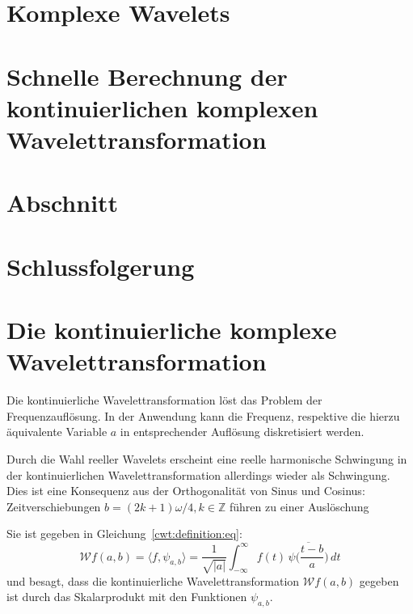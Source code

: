 \begin{refsection}

\section{Komplexe Wavelets}

\section{Schnelle Berechnung der kontinuierlichen komplexen Wavelettransformation}

\section{Abschnitt}

\section{Schlussfolgerung}

\section{Die kontinuierliche komplexe Wavelettransformation}
Die kontinuierliche Wavelettransformation löst das Problem der Frequenzauflösung.
In der Anwendung kann die Frequenz, respektive die hierzu äquivalente Variable $a$ in entsprechender Auflösung diskretisiert werden.

Durch die Wahl reeller Wavelets erscheint eine reelle harmonische Schwingung in der kontinuierlichen Wavelettransformation allerdings wieder als Schwingung.
Dies ist eine Konsequenz aus der Orthogonalität von Sinus und Cosinus: Zeitverschiebungen $b = (2k+1)\omega / 4, k \in\mathbb Z$ führen zu einer Auslöschung

Sie ist gegeben in Gleichung~\eqref{cwt:definition:eq}:
\[
\mathcal{W}f (a,b)
=
\langle f,\psi_{a,b}\rangle
=
\frac{1}{\sqrt{|a|}}\int_{-\infty}^\infty f(t)\,\overline{
	\psi\biggl(\frac{t-b}{a}\biggr)}\,dt
\]
und besagt, dass die kontinuierliche Wavelettransformation $\mathcal{W}f(a,b)$ gegeben ist durch das Skalarprodukt mit den Funktionen $\psi_{a,b}$.


\printbibliography[heading=subbibliography]
\end{refsection}
